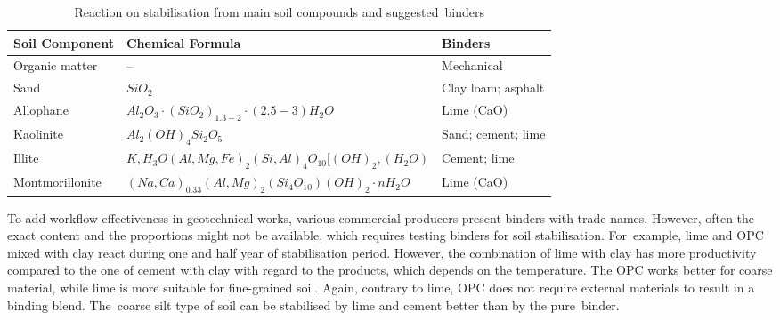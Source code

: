 \documentclass[electronics,article,accept,pdftex,moreauthors]{Definitions/mdpi}
\begin{document}
\begin{table}[H]
\caption{Reaction on stabilisation from main soil compounds and suggested~binders}
 \begin{tabularx}{\textwidth}{lll}
 \toprule
        \textbf{Soil Component} & \textbf{Chemical Formula} & \textbf{Binders} \\ 
        \midrule
        Organic matter & – & Mechanical \\ 
        Sand & $SiO_2$ & Clay loam; asphalt \\
        Allophane & $Al_2O_3·(SiO_2)_{1.3-2}·(2.5-3)H_2 O$ %
        & Lime (CaO) \\ 
        Kaolinite & $Al_2(OH)_4 Si_2 O_5$ & Sand; cement; lime \\ 
        Illite & $K,H_3 O(Al,Mg,Fe)_2 (Si,Al)_4 O_{10} [(OH)_2,(H_2O)$ & Cement; lime \\
        Montmorillonite & $(Na,Ca)_{0.33}(Al,Mg)_2 (Si_4 O_{10})(OH)_2·nH_2 O$ & Lime (CaO) \\ 
        \bottomrule
  \end{tabularx} \label{tab:3}
\end{table}

To{ add }workflow effectiveness in{ }geotechnical works, various {commercial producers present }binders with trade names. However, often the exact content and the proportions might not be available, which requires testing binders for soil stabilisation. For~example, lime and OPC mixed with clay {react during one and half year of stabilisation period}. However, {the combination of lime with clay} has more productivity compared to {the one of cement with clay} with regard to {the} products, which depends on the temperature. {The} OPC works better for coarse material, while lime is more suitable for fine-grained soil. Again, contrary to lime, OPC does not require external materials to result in a binding blend. The~coarse silt type of soil can be stabilised by lime and cement better than by the pure~binder.
\end{document}

